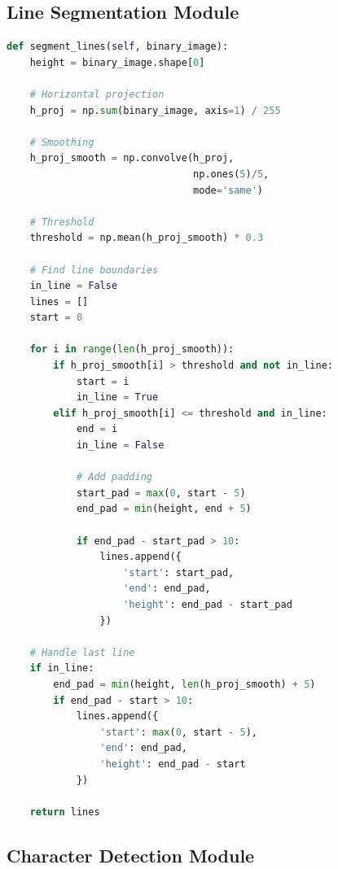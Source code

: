 \documentclass[12pt,a4paper,oneside]{report}
\begin{document}
\subsection{Line Segmentation Module}

\begin{lstlisting}[language=Python, caption=Line Segmentation Implementation]
def segment_lines(self, binary_image):
    height = binary_image.shape[0]
    
    # Horizontal projection
    h_proj = np.sum(binary_image, axis=1) / 255
    
    # Smoothing
    h_proj_smooth = np.convolve(h_proj, 
                                np.ones(5)/5, 
                                mode='same')
    
    # Threshold
    threshold = np.mean(h_proj_smooth) * 0.3
    
    # Find line boundaries
    in_line = False
    lines = []
    start = 0
    
    for i in range(len(h_proj_smooth)):
        if h_proj_smooth[i] > threshold and not in_line:
            start = i
            in_line = True
        elif h_proj_smooth[i] <= threshold and in_line:
            end = i
            in_line = False
            
            # Add padding
            start_pad = max(0, start - 5)
            end_pad = min(height, end + 5)
            
            if end_pad - start_pad > 10:
                lines.append({
                    'start': start_pad,
                    'end': end_pad,
                    'height': end_pad - start_pad
                })
    
    # Handle last line
    if in_line:
        end_pad = min(height, len(h_proj_smooth) + 5)
        if end_pad - start > 10:
            lines.append({
                'start': max(0, start - 5),
                'end': end_pad,
                'height': end_pad - start
            })
    
    return lines
\end{lstlisting}

\subsection{Character Detection Module}
\end{document}
